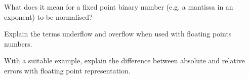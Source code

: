 \begin{questions}
	\question What does it mean for a fixed point binary number (e.g. a mantissa in an exponent) to be normalised? 

	\question Explain the terms underflow and overflow when used with floating points numbers. 

	\question With a suitable example, explain the difference between absolute and relative errors with floating point representation. 

	


\end{questions}

